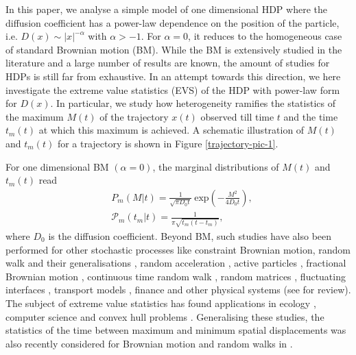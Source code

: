 \documentclass[showpacs,amsmath,amssymb,aps,pre,twocolumn,]{revtex4-1}
\def\bluew#1{{\color{black} #1}}
\begin{document}
 
In this paper, we analyse a simple model of one dimensional HDP where the diffusion coefficient has a power-law dependence on the position of the particle, i.e. $D(x) \sim |x|^{-\alpha}$ with $\alpha >-1$. For $\alpha =0$, it reduces to the homogeneous case of standard Brownian motion (BM). While the BM is extensively studied in the literature and a large number of results are known, the amount of studies for HDPs is still far from exhaustive. In an attempt towards this direction, we here investigate the extreme value statistics (EVS) of the HDP with power-law form for $D(x)$. In particular, we study how heterogeneity ramifies the statistics of the maximum $M(t)$ of the trajectory $x(t)$ observed till time $t$ and the time $t_m(t)$ at which this maximum is achieved. A schematic illustration of $M(t)$ and $t_m(t)$ for a trajectory is shown in Figure \ref{trajectory-pic-1}.

For one dimensional BM $(\alpha = 0)$, the marginal distributions of $M(t)$ and $t_m(t)$ read \bluew{\cite{Levy}}
\begin{align}
& P_m(M|t) = \frac{1}{\sqrt{\pi D_0 t}}~\text{exp} \left( -\frac{M^2}{4 D_0 t}\right) ,
\label{extreme-eq-20-ne-1} \\
& \mathcal{P}_m(t_m|t) = \frac{1}{\pi \sqrt{t_m(t-t_m)}},\label{extreme-eq-20-ne-2}
\end{align}
where $D_0$ is the diffusion coefficient. Beyond BM, such studies have also been performed for other stochastic processes like constraint Brownian motion, random walk and their generalisations \bluew{\cite{Levy,tmax-2, EVS-correlated-2,EVS-correlated-3, EVS-correlated-4, Andersen, Rambeau11, PrashantArnab2021, MoriMajmax2021}}, random acceleration \bluew{\cite{tmax-RAP, Burkhardt1993, Singhrandom2020}}, active particles \bluew{\cite{tmax-RTP-1, Mori2020}}, fractional Brownian motion \bluew{\cite{tmax-FBM-1, tmax-FBM-3, tmax-anamolous}}, continuous time random walk \bluew{\cite{tmax-CTRW}}, random matrices \bluew{\cite{RM-1, RM-2, RM-3}}, fluctuating interfaces \bluew{\cite{KPZ-1, KPZ-2, tmax-interface-growth}}, transport models \bluew{\cite{EVS-con-1, EVS-STR, EVS-con-4}}, finance \bluew{\cite{tmax-3}} and other physical systems \bluew{\cite{disorder-1, spin,EVS-con-3,EVS-con-5, EVS-con-6}} (see \bluew{\cite{EVS-review-1, EVS-review-2, EVS-review-3, EVS-review-4, EVS-review-5, EVS-review-6, EVS-review-7, EVS-review-cor, Sabhapanditrev, Revsatya}} for review). The subject of extreme value statistics has found applications in ecology \bluew{\cite{ecology}}, computer science \bluew{\cite{tree, CS-1, CS-2}} and convex hull problems \bluew{\cite{Furling2009}}. Generalising these studies, the statistics of the time between maximum and minimum spatial displacements was also recently considered for Brownian motion and random walks in \bluew{\cite{mori2019, MoriMaj2020}}.  
\end{document}
